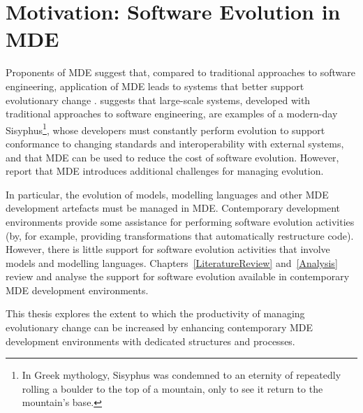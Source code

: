 
\section{Motivation: Software Evolution in MDE}
Proponents of MDE suggest that, compared to traditional approaches to software engineering, application of MDE leads to systems that better support evolutionary change \cite{kleppe03mda}. \cite{frankel02mda} suggests that large-scale systems, developed with traditional approaches to software engineering, are examples of a  modern-day Sisyphus\footnote{In Greek mythology, Sisyphus was condemned to an eternity of repeatedly rolling a boulder to the top of a mountain, only to see it return to the mountain's base.}, whose developers must constantly perform evolution to support conformance to changing standards and interoperability with external systems, and that MDE can be used to reduce the cost of software evolution. However, \cite{Mens07} report that MDE introduces additional challenges for managing evolution.

In particular, the evolution of models, modelling languages and other MDE development artefacts must be managed in MDE. Contemporary development environments provide some assistance for performing software evolution activities (by, for example, providing transformations that automatically restructure code). However, there is little support for software evolution activities that involve models and modelling languages. Chapters~\ref{LiteratureReview} and~\ref{Analysis} review and analyse the support for software evolution available in contemporary MDE development environments.


This thesis explores the extent to which the productivity of managing evolutionary change can be increased by enhancing contemporary MDE development environments with dedicated structures and processes.
